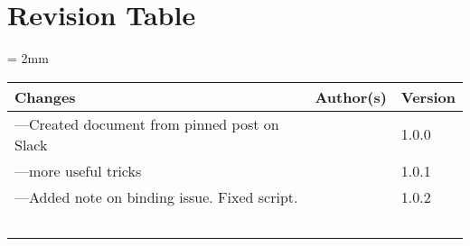 \documentclass[class=Report, crop=false]{standalone}
\begin{document}
\section*{Revision Table}

\begin{table}[H]
  \centering
  \scriptsize
  \tabulinesep = 2mm
  \begin{tabu}{|l|P{1.5in}|P{1in}|} \hline
    \textbf{Changes}                                          & \textbf{Author(s)}                                                           & \textbf{Version} \\ \hline
    [2020/07/10]---Created document from pinned post on Slack & \parbox{1.05in}{} & 1.0.0            \\ \hline
    [2020/07/14]---more useful tricks                         & \parbox{1.05in}{}                                       & 1.0.1            \\ \hline
    [2020/12/06]---Added note on binding issue. Fixed script. & \parbox{1.05in}{}                               & 1.0.2            \\ \hline
                                                              &                                                                              &                  \\ \hline
                                                              &                                                                              &                  \\ \hline
                                                              &                                                                              &                  \\ \hline
                                                              &                                                                              &                  \\ \hline
                                                              &                                                                              &                  \\ \hline
  \end{tabu}
\end{table}
\end{document}
